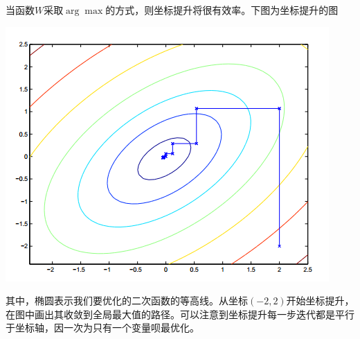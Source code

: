 当函数$W$采取$\arg\max$的方式，则坐标提升将很有效率。下图为坐标提升的图
\begin{center}
\includegraphics[scale=1]{../figures/SVM5.PNG} 
\end{center}

其中，椭圆表示我们要优化的二次函数的等高线。从坐标$(-2,2)$开始坐标提升，在图中画出其收敛到全局最大值的路径。可以注意到坐标提升每一步迭代都是平行于坐标轴，因一次为只有一个变量呗最优化。

